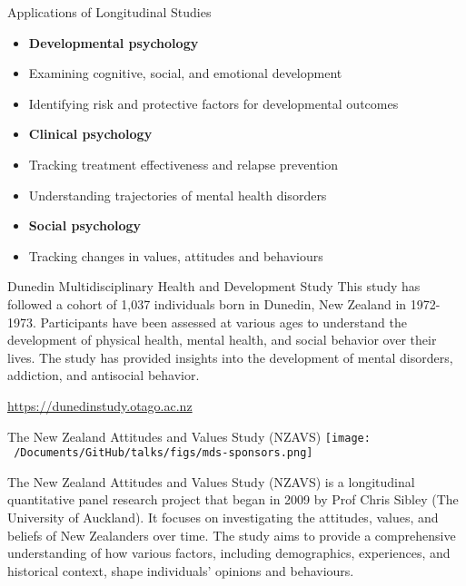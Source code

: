 \documentclass[
  ignorenonframetext,
  aspectratio=169,
]{beamer}
\providecommand{\tightlist}{%
  \setlength{\itemsep}{0pt}\setlength{\parskip}{0pt}}\usepackage{longtable,booktabs,array}
\begin{document}
\begin{frame}{Applications of Longitudinal Studies}
\label{applications-of-longitudinal-studies}
\begin{itemize}[<+->]
\tightlist
\item
  \textbf{Developmental psychology}
\item
  Examining cognitive, social, and emotional development
\item
  Identifying risk and protective factors for developmental outcomes
\item
  \textbf{Clinical psychology}
\item
  Tracking treatment effectiveness and relapse prevention
\item
  Understanding trajectories of mental health disorders
\item
  \textbf{Social psychology}
\item
  Tracking changes in values, attitudes and behaviours
\end{itemize}
\end{frame}

\begin{frame}{Dunedin Multidisciplinary Health and Development Study}
\label{dunedin-multidisciplinary-health-and-development-study}
This study has followed a cohort of 1,037 individuals born in Dunedin,
New Zealand in 1972-1973. Participants have been assessed at various
ages to understand the development of physical health, mental health,
and social behavior over their lives. The study has provided insights
into the development of mental disorders, addiction, and antisocial
behavior.

\url{https://dunedinstudy.otago.ac.nz}
\end{frame}

\begin{frame}{The New Zealand Attitudes and Values Study (NZAVS)}
\label{the-new-zealand-attitudes-and-values-study-nzavs}
\texttt{[image: ~/Documents/GitHub/talks/figs/mds-sponsors.png]}
\end{frame}

\begin{frame}
The New Zealand Attitudes and Values Study (NZAVS) is a longitudinal
quantitative panel research project that began in 2009 by Prof Chris
Sibley (The University of Auckland). It focuses on investigating the
attitudes, values, and beliefs of New Zealanders over time. The study
aims to provide a comprehensive understanding of how various factors,
including demographics, experiences, and historical context, shape
individuals' opinions and behaviours.
\end{frame}
\end{document}
